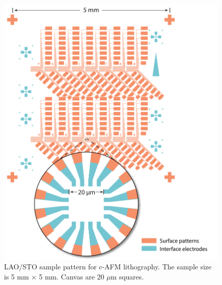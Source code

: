 \documentclass[pdflatex, sectionletters, 12pt]{pittetd}    %
\begin{document}
\begin{figure}[p]
	\centering
	\includegraphics[width=1\textwidth]{Drawing/Regular.pdf}
	\caption{LAO/STO sample pattern for c-AFM lithography. The sample size is 5 mm $\times$ 5 mm. Canvas are 20 $\mu$m squares.}
	\label{FIG:Regular}
\end{figure}




\end{document}
